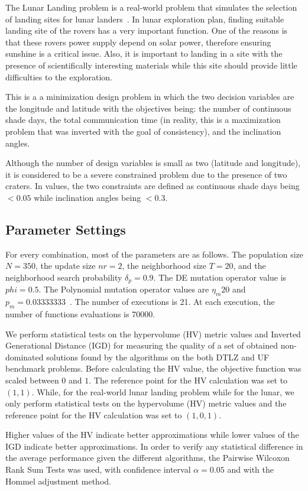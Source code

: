 The Lunar Landing problem is a real-world problem that simulates the selection of landing sites for lunar landers~\citep{MoonOrbitingSatellite2015}. In lunar exploration plan, finding suitable landing site of the rovers has a very important function. One of the reasons is that these rovers power supply depend on solar power, therefore ensuring sunshine is a critical issue. Also, it is important to landing in a site with the presence of scientifically interesting materials while this site should provide little difficulties to the exploration. 

This is a a minimization design problem in which the two decision variables are the longitude and latitude with the objectives being: the number of continuous shade days, the total communication time (in reality, this is a maximization problem that was inverted with the goal of consistency), and the inclination angles. 

Although the number of design variables is small as two (latitude and longitude), it is considered to be a severe constrained problem due to the presence of two craters. In values, the two constraints are defined as continuous shade days  being $ < 0.05$ while inclination angles being $<0.3$.

\subsection{Parameter Settings}

For every combination, most of the parameters are as follows. The population size $N = 350$, the update size $nr = 2$, the neighborhood size $T = 20$, and the neighborhood search probability $\delta_p = 0.9$. The DE mutation operator value is $phi=0.5$. The Polynomial mutation operator values are $\eta_m 20$ and $p_m = 0.03333333$~\cite{campelo2018moeadr}. The number of executions is 21. At each execution, the number of functions evaluations is 70000.

We perform statistical tests on the hypervolume (HV) metric values and Inverted Generational Distance (IGD) for measuring the quality of a set of obtained non-dominated solutions found by the algorithms on the both DTLZ and UF benchmark problems. Before calculating the HV value, the objective function was scaled between $0$ and $1$. The reference point for the HV calculation was set to $(1, 1)$. While, for the real-world lunar landing problem while for the lunar,  we only perform statistical tests on the hypervolume (HV) metric values and the reference point for the HV calculation was set to $(1, 0, 1)$. 

Higher values of the HV indicate better approximations while lower values of the IGD indicate better approximations. In order to verify any statistical difference in the average performance given the different algorithms, the Pairwise Wilcoxon Rank Sum Tests was used, with confidence interval $\alpha = 0.05$ and with the Hommel adjustment method.
